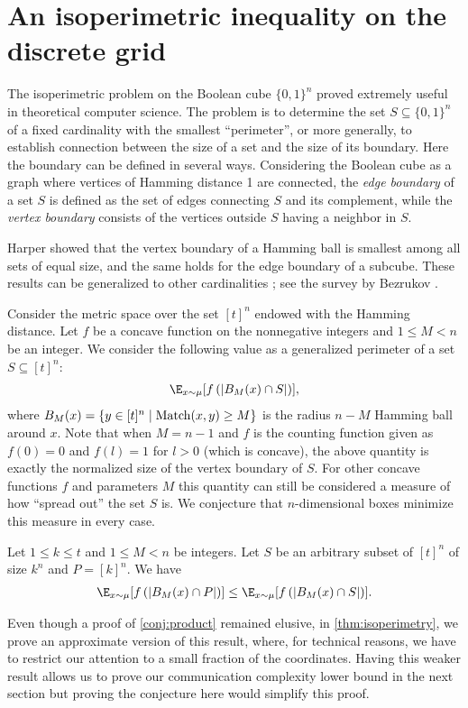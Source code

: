 \section{An isoperimetric inequality on the discrete grid}
\label{sec:isoperimetry}
The isoperimetric problem on the Boolean cube $\{0,1\}^n$ proved
extremely useful in theoretical computer science. The problem is
to determine the set $S\subseteq \{0,1\}^n$ of a fixed
cardinality with the smallest ``perimeter'', or more generally,
to establish connection between the size of a set and the size
of its boundary. Here the boundary can be defined in several
ways. Considering the Boolean cube as a graph where vertices of
Hamming distance 1 are connected, the {\em edge boundary} of a
set $S$ is defined as the set of edges connecting $S$ and its
complement, while the {\em vertex boundary} consists of the
vertices outside $S$ having a neighbor in $S$.

Harper \cite{Harper1964} showed that the vertex boundary of a
Hamming ball is smallest among all sets of equal size, and the
same holds for the edge boundary of a subcube. These results can
be generalized to other cardinalities \cite{Hart1976}; see the
survey by Bezrukov \cite{Bezrukov1994}.

Consider the metric space over the set $[t]^n$ endowed 
with the Hamming distance.
Let $f$ be a concave function on the nonnegative integers 
and $1\le M<n$ be an integer. 
We consider the following
value as a generalized perimeter of a set $S\subseteq[t]^n$:
\begin{align*}
\E_{x\sim\mu}[f\left(\left|B_M(x)\cap S\right|\right)],
\end{align*}
where $B_M(x)=\{y\in[t]^n\mid\operatorname{Match}(x,y)\ge M\}$ is the radius
$n-M$ Hamming ball around $x$. Note that when $M=n-1$ and $f$ is
the counting function given as $f(0)=0$ and $f(l)=1$ for $l>0$
(which is concave), the above quantity is exactly the normalized
size of the vertex boundary of $S$. For other concave functions
$f$ and parameters $M$ this quantity can still be considered a
measure of how ``spread out'' the set $S$ is. We conjecture that
$n$-dimensional boxes minimize this measure in every case.

\begin{conjecture}
\label{conj:product}
Let $1\le k\le t$ and $1\le M<n$ be integers. 
Let $S$ be an arbitrary subset of $[t]^n$ of size $k^n$ and 
$P=[k]^n$. We have
\begin{align*}
\E_{x\sim\mu}[f\left(\left|B_M(x)\cap P\right|\right)]\leq
\E_{x\sim\mu}[f\left(\left|B_M(x)\cap S\right|\right)].
\end{align*}
\end{conjecture}
Even though a proof of \autoref{conj:product} remained elusive,
in \autoref{thm:isoperimetry}, we prove an approximate version
of this result, where, for technical reasons, we have to
restrict our attention to a small fraction of the coordinates.
Having this weaker result allows us to prove our communication
complexity lower bound in the next section but proving the
conjecture here would simplify this proof.

